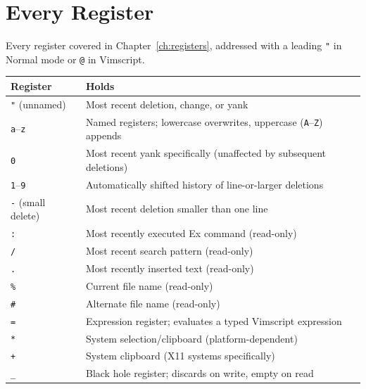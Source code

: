 \chapter{Every Register}
\label{app:registers}

Every register covered in Chapter~\ref{ch:registers}, addressed with a leading \texttt{"} in Normal mode or \texttt{@} in Vimscript.

\begin{longtable}{@{}l p{9.5cm}@{}}
\textbf{Register} & \textbf{Holds} \\
\hline
\endhead
\texttt{"} (unnamed) & Most recent deletion, change, or yank \\
\texttt{a}--\texttt{z} & Named registers; lowercase overwrites, uppercase (\texttt{A}--\texttt{Z}) appends \\
\texttt{0} & Most recent yank specifically (unaffected by subsequent deletions) \\
\texttt{1}--\texttt{9} & Automatically shifted history of line-or-larger deletions \\
\texttt{-} (small delete) & Most recent deletion smaller than one line \\
\texttt{:} & Most recently executed Ex command (read-only) \\
\texttt{/} & Most recent search pattern (read-only) \\
\texttt{.} & Most recently inserted text (read-only) \\
\texttt{\%} & Current file name (read-only) \\
\texttt{\#} & Alternate file name (read-only) \\
\texttt{=} & Expression register; evaluates a typed Vimscript expression \\
\texttt{*} & System selection/clipboard (platform-dependent) \\
\texttt{+} & System clipboard (X11 systems specifically) \\
\texttt{\_} & Black hole register; discards on write, empty on read \\
\end{longtable}
